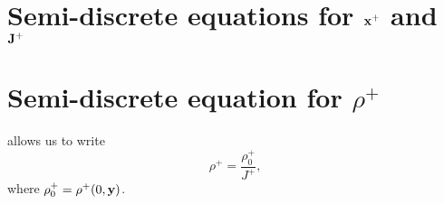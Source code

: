 \documentclass[11pt]{article}
\begin{document}
\section{Semi-discrete equations for $\mathbf{x}^+$ and $\mathbf{J}^+$}

\section{Semi-discrete equation for $\rho^+$}
 allows us to write
\begin{equation}
    \label{eq:evol_rho_semi_discrete}
    \rho^+ = \frac{\rho^+_0}{J^+},
\end{equation}
where $\rho^+_0 = \rho^+(0,\mathbf{y})$.

\end{document}
